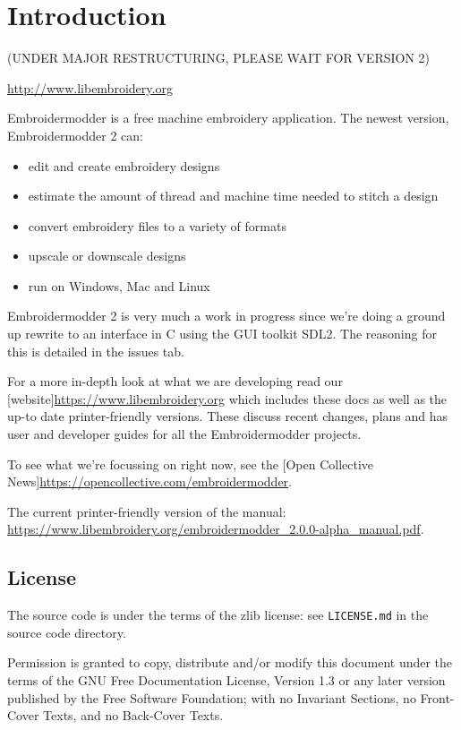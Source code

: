 
\chapter{Introduction}

(UNDER MAJOR RESTRUCTURING, PLEASE WAIT FOR VERSION 2)

\url{http://www.libembroidery.org}

Embroidermodder is a free machine embroidery application.
The newest version, Embroidermodder 2 can:

\begin{itemize}
\item edit and create embroidery designs
\item estimate the amount of thread and machine time needed to stitch a design
\item convert embroidery files to a variety of formats
\item upscale or downscale designs
\item run on Windows, Mac and Linux
\end{itemize}

Embroidermodder 2 is very much a work in progress since we're doing a ground
up rewrite to an interface in C using the GUI toolkit SDL2.
The reasoning for this is detailed in the issues tab.

For a more in-depth look at what we are developing read
our [website]\url{https://www.libembroidery.org} which includes these docs as well as the up-to date printer-friendly versions.
These discuss recent changes, plans and has user and developer guides for all the Embroidermodder projects.

To see what we're focussing on right now, see the [Open Collective News]\url{https://opencollective.com/embroidermodder}.

The current printer-friendly version of the manual: \url{https://www.libembroidery.org/embroidermodder_2.0.0-alpha_manual.pdf}.

\section{License}

The source code is under the terms of the zlib license: see \texttt{LICENSE.md} in the source code directory.

Permission is granted to copy, distribute and/or modify this document
under the terms of the GNU Free Documentation License, Version 1.3
or any later version published by the Free Software Foundation;
with no Invariant Sections, no Front-Cover Texts, and no Back-Cover Texts.

